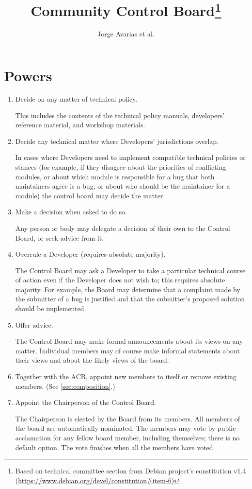 \documentclass[]{article}
\title{Community Control Board\footnote{Based on technical committee section from Debian project's constitution v1.4 (\url{https://www.debian.org/devel/constitution\#item-6})}}
\author{Jorge Avarias et al.}
\begin{document}
\maketitle

\section{Powers}
\begin{enumerate}

\item Decide on any matter of technical policy.

    This includes the contents of the technical policy manuals, developers' reference material, 
    and workshop materials.

\item Decide any technical matter where Developers' jurisdictions overlap.

    In cases where Developers need to implement compatible technical policies or stances (for example, if they disagree about the priorities of conflicting modules, or about which module is responsible for a bug that both maintainers agree is a bug, or about who should be the maintainer for a module) the control board may decide the matter.

\item Make a decision when asked to do so.

    Any person or body may delegate a decision of their own to the Control Board, or seek advice from it.

\item Overrule a Developer (requires absolute majority).

    The Control Board may ask a Developer to take a particular technical course of action even if the Developer does not wish to; this requires absolute majority. For example, the Board may determine that a complaint made by the submitter of a bug is justified and that the submitter's proposed solution should be implemented.

\item Offer advice.

    The Control Board may make formal announcements about its views on any matter. Individual members may of course make informal statements about their views and about the likely views of the board.

\item Together with the ACB, appoint new members to itself or remove existing members. (See \ref{sec:composition}.)

\item Appoint the Chairperson of the Control Board.

    The Chairperson is elected by the Board from its members. All members of the board are automatically nominated. The members may vote by public acclamation for any fellow board member, including themselves; there is no default option. The vote finishes when all the members have voted.

\end{enumerate}
\end{document}
